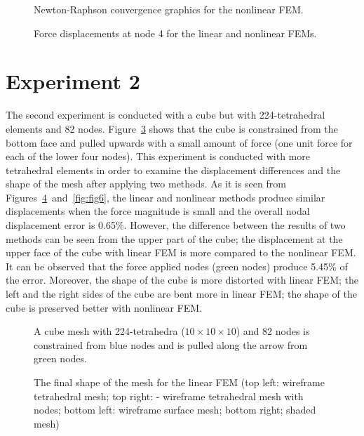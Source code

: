 \begin{figure}
\centerline{}
\caption{Newton-Raphson convergence graphics for the nonlinear FEM.}
\label{fig:conv}
\end{figure}


\begin{figure}[h]
\centerline{}
\caption{Force displacements at node 4 for the linear and nonlinear FEMs.}
\label{fig:epsFEM}
\end{figure}

\clearpage
\section{Experiment 2}
\label{ii}

The second experiment is conducted with a cube but with 224-tetrahedral elements and 82 nodes. Figure~\ref{fig:fig4} shows that the cube is constrained from the bottom face and pulled upwards with a small amount of force (one unit force for each of the lower four nodes). This experiment is conducted with more tetrahedral elements in order to examine the displacement differences and the shape of the mesh after applying two methods. As it is seen from Figures~\ref{fig:fig5}~and~\ref{fig:fig6}, the linear and nonlinear methods produce similar displacements when the force magnitude is small and the overall nodal displacement error is 0.65\%. However, the difference between the results of two methods can be seen from the upper part of the cube; the displacement at the upper face of the cube with linear FEM is more compared to the nonlinear FEM. It can be observed that the force applied nodes (green nodes) produce 5.45\% of the error. Moreover, the shape of the cube is more distorted with linear FEM; the left and the right sides of the cube are bent more in linear FEM; the shape of the cube is preserved better with nonlinear FEM.

\begin{figure}[h]
\centerline{}
\caption{A cube mesh with 224-tetrahedra ($10 \times 10 \times 10$) and 82 nodes is constrained from blue nodes and is pulled along the arrow from green nodes.}
\label{fig:fig4}
\end{figure}

\begin{figure}[h]
\centerline{}
\caption{The final shape of the mesh for the linear FEM (top left: wireframe tetrahedral mesh; top right: - wireframe tetrahedral mesh with nodes; bottom left: wireframe surface mesh; bottom right; shaded mesh)}
\label{fig:fig5}
\end{figure}

